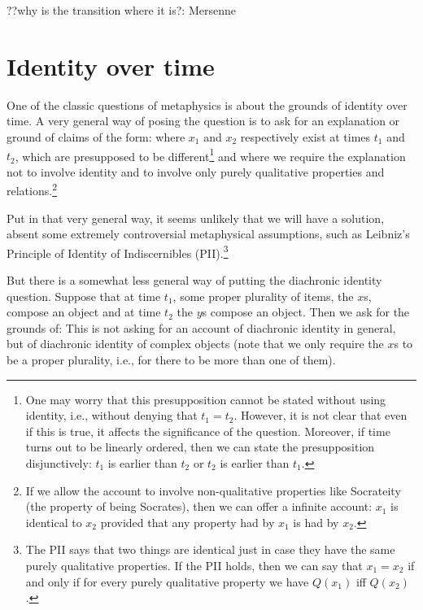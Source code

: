 ??why is the transition where it is?: Mersenne

\section{Identity over time}
One of the classic questions of metaphysics is about the grounds of identity over time. 
A very general way of posing the question is to ask for an explanation or ground of claims
of the form:
where $x_1$ and $x_2$ respectively exist at times $t_1$ and $t_2$, which are presupposed to be different\footnote{One may worry that this
presupposition cannot be stated without using identity, i.e., without denying that
$t_1=t_2$. However, it is not clear that even if this is true, it affects the
significance of the question. Moreover, if time turns out to be linearly ordered,
then we can state the presupposition disjunctively: $t_1$ is earlier than $t_2$ 
or $t_2$ is earlier than $t_1$.} and where we require the explanation not to
involve identity and to involve only purely qualitative properties and 
relations.\footnote{If we allow the account to involve non-qualitative properties 
like Socrateity (the property of being Socrates), then we can offer a infinite 
account: $x_1$ is identical to $x_2$ provided that any property had by $x_1$ is 
had by $x_2$.}

Put in that very general way, it seems unlikely that we will have a solution, 
absent some extremely controversial metaphysical assumptions, such as 
Leibniz's Principle of Identity of Indiscernibles (PII).\footnote{The PII says
that two things are identical just in case they have the same purely qualitative
properties. If the PII holds, then we can say that $x_1=x_2$ if and only if 
for every purely qualitative property we have $Q(x_1)$ iff $Q(x_2)$.} 

But there is a somewhat less general way of putting the diachronic identity question.
Suppose that at time $t_1$, some proper plurality of items, the $x$s, compose an 
object and at time $t_2$ the $y$s compose an object. Then we ask for the grounds of:
This is not asking for an account of diachronic identity in general, but of diachronic
identity of complex objects (note that we only require the $x$s to be a proper
plurality, i.e., for there to be more than one of them).
    
